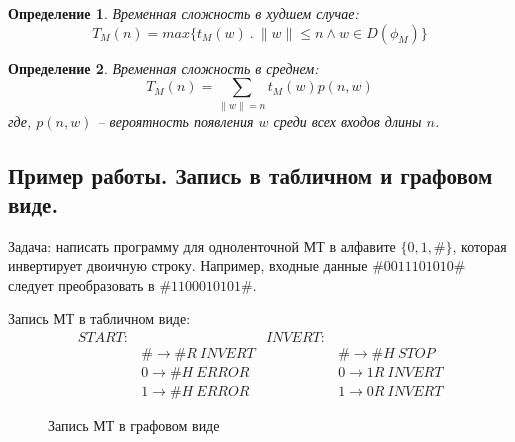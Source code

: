 \documentclass[a4paper, 12pt]{extarticle}
\newtheorem*{definition}{Определение}
\newcommand{\MTRule}[4]{#1 \rightarrow #2 #3 \ #4}
\begin{document}
\begin{definition}
 Временная сложность в худшем случае: 
 $$T_M(n) = max\{t_M(w) \ . \ \|w\| \leq n \land w \in D(\phi_M)\}$$
\end{definition}

\begin{definition}
 Временная сложность в среднем:
  $$T_M(n) = \sum_{\|w\| = n} t_M(w) p(n, w)$$
  где, $p(n, w)$ -- вероятность появления $w$ среди всех входов длины $n$.
\end{definition}

\subsection*{Пример работы. Запись в табличном и графовом виде.}
Задача: написать программу для одноленточной МТ в алфавите $\{0, 1, \#\}$, которая инвертирует двоичную строку. Например,
входные данные $\#0011101010\#$ следует преобразовать в $\#1100010101\#$.

Запись МТ в табличном виде:
\begin{align*}
START: &                            & INVERT:&                         \\
       & \MTRule{\#}{\#}{R}{INVERT} &       & \MTRule{\#}{\#}{H}{STOP} \\
       & \MTRule{0}{\#}{H}{ERROR}   &       & \MTRule{0}{1}{R}{INVERT} \\
       & \MTRule{1}{\#}{H}{ERROR}   &       & \MTRule{1}{0}{R}{INVERT} 
\end{align*}

\begin{figure}[h!]
\begin{center}
\end{center}
\caption{Запись МТ в графовом виде}
\end{figure}
\end{document}
